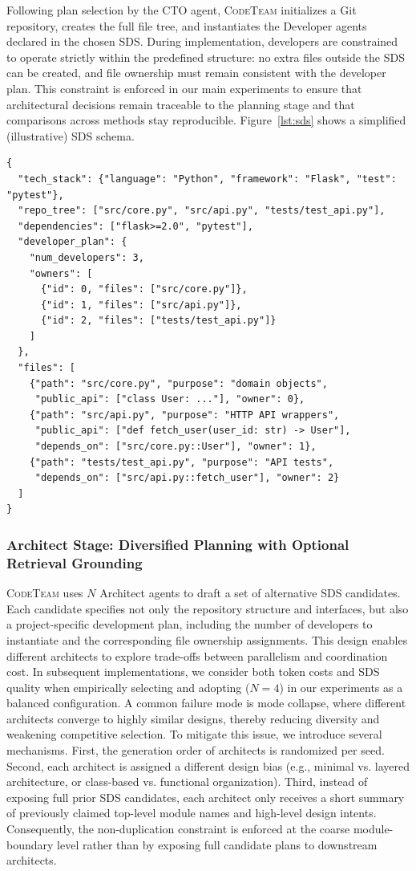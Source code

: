 \documentclass[format=acmsmall, review=false, screen=true]{acmart}
\newcommand{\tool}{\textsc{CodeTeam}\xspace}
\begin{document}
Following plan selection by the CTO agent, \tool initializes a Git repository, creates the full file tree, and instantiates the Developer agents declared in the chosen SDS. During implementation, developers are constrained to operate strictly within the predefined structure: no extra files outside the SDS can be created, and file ownership must remain consistent with the developer plan. This constraint is enforced in our main experiments to ensure that architectural decisions remain traceable to the planning stage and that comparisons across methods stay reproducible. Figure~\ref{lst:sds} shows a simplified (illustrative) SDS schema.


\begin{lstlisting}[caption={Simplified SDS schema},label={lst:sds},basicstyle=\ttfamily\scriptsize]
{
  "tech_stack": {"language": "Python", "framework": "Flask", "test": "pytest"},
  "repo_tree": ["src/core.py", "src/api.py", "tests/test_api.py"],
  "dependencies": ["flask>=2.0", "pytest"],
  "developer_plan": {
    "num_developers": 3,
    "owners": [
      {"id": 0, "files": ["src/core.py"]},
      {"id": 1, "files": ["src/api.py"]},
      {"id": 2, "files": ["tests/test_api.py"]}
    ]
  },
  "files": [
    {"path": "src/core.py", "purpose": "domain objects",
     "public_api": ["class User: ..."], "owner": 0},
    {"path": "src/api.py", "purpose": "HTTP API wrappers",
     "public_api": ["def fetch_user(user_id: str) -> User"],
     "depends_on": ["src/core.py::User"], "owner": 1},
    {"path": "tests/test_api.py", "purpose": "API tests",
     "depends_on": ["src/api.py::fetch_user"], "owner": 2}
  ]
}
\end{lstlisting}

\subsubsection{Architect Stage: Diversified Planning with Optional Retrieval Grounding}
\tool uses $N$ Architect agents to draft a set of alternative SDS candidates. Each candidate specifies not only the repository structure and interfaces, but also a project-specific development plan, including the number of developers to instantiate and the corresponding file ownership assignments. This design enables different architects to explore trade-offs between parallelism and coordination cost. In subsequent implementations, we consider both token costs and SDS quality when empirically selecting and adopting ($N{=}4$) in our experiments as a balanced configuration. A common failure mode is mode collapse, where different architects converge to highly similar designs, thereby reducing diversity and weakening competitive selection. To mitigate this issue, we introduce several mechanisms. First, the generation order of architects is randomized per seed. Second, each architect is assigned a different design bias (e.g., minimal vs. layered architecture, or class-based vs. functional organization). Third, instead of exposing full prior SDS candidates, each architect only receives a short summary of previously claimed top-level module names and high-level design intents. Consequently, the non-duplication constraint is enforced at the coarse module-boundary level rather than by exposing full candidate plans to downstream architects.
\end{document}
